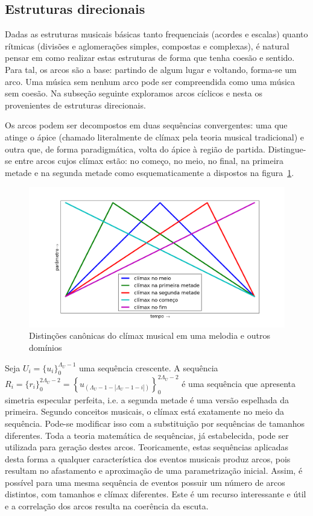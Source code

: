 \subsection{Estruturas direcionais}

Dadas as estruturas musicais básicas tanto frequenciais (acordes e escalas) quanto 
rítmicas (divisões e aglomerações simples, compostas e complexas), é 
natural pensar em como realizar estas estruturas de forma que tenha coesão e sentido.\cite{Boulez}
Para tal, os arcos são a base: partindo de algum lugar e voltando, forma-se um arco. Uma música sem nenhum arco pode ser compreendida como uma música sem coesão.
Na subseção seguinte exploramos arcos cíclicos e nesta
os provenientes de estruturas direcionais.

Os arcos podem ser decompostos em duas sequências convergentes: 
uma que atinge o ápice (chamado literalmente de clímax pela teoria musical tradicional) e 
outra que, de forma paradigmática, volta do ápice à região de partida. Distingue-se entre arcos cujos clímax estão: no começo, no meio, no final, na primeira metade e na segunda metade como esquematicamente a dispostos na figura~\ref{fig:climax}.\cite{Schoenberg}

\begin{figure}[h!]
    \centering
        \includegraphics[width=\textwidth]{figuras/climax}
    \caption{Distinções canônicas do clímax musical em uma melodia e outros domínios}
        \label{fig:climax}
\end{figure}


Seja $U_i=\{u_i\}_0^{\Lambda_U-1}$ uma sequência crescente. A sequência 
$R_i=\{r_i\}_0^{2\Lambda_U -2}=\left\{u_{(\Lambda_U-1-|\Lambda_U-1-i|)}\right\}_0^{2\Lambda_U-2}$ 
é uma sequência que apresenta simetria especular perfeita, i.e. a segunda metade é uma versão espelhada da primeira. Segundo conceitos musicais, o clímax está exatamente no meio da sequência. Pode-se modificar isso com a substituição por sequências de tamanhos diferentes. Toda a teoria matemática de sequências, já estabelecida, pode ser utilizada para geração destes arcos.\cite{Guidorizzo,Schoenberg}
Teoricamente, estas sequências aplicadas desta forma
a qualquer característica dos eventos musicais produz arcos,
pois resultam no afastamento e aproximação de uma parametrização inicial. 
Assim, é possível para uma mesma sequência de eventos possuir um número de arcos distintos, com tamanhos e clímax diferentes. Este é um recurso
interessante e útil e a correlação dos arcos resulta na coerência da escuta.\cite{Schachter}

